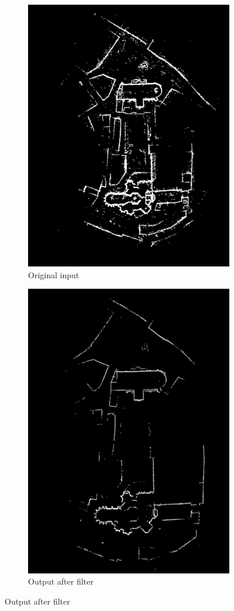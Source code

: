 \documentclass[10pt,twocolumn,letterpaper]{article}
\begin{document}
\begin{figure}

\begin{subfigure}{.5\linewidth}
  \centering
  \includegraphics[width=.8\linewidth]{images/Selection_031.png}
  \caption{Original input}
  \label{fig:sfig1}
\end{subfigure}%
\begin{subfigure}{.5\linewidth}
  \centering
  \includegraphics[width=.8\linewidth]{images/Selection_032.png}
  \caption{Output after filter}
  \label{fig:sfig2}
\end{subfigure}

\end{figure}
\end{document}
